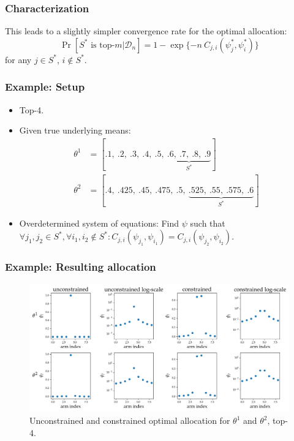 \documentclass[aspectratio=43]{beamer}
\begin{document}
\begin{frame}
\frametitle{Characterization}
  This leads to a slightly simpler convergence rate for the optimal allocation:
  \[\Pr[S^* \text{ is top-}m |
      \mathcal{D}_n] = 1 - \exp\{-n\ C_{j, i}(\psi^*_j, \psi^*_i)\}\]
  for any $j \in S^*$, $i \notin S^*$.
\end{frame}

\begin{frame}
\frametitle{Example: Setup}
\begin{itemize}[<+->]
  \item Top-4.
  \item Given true underlying means:
    \begin{align}
      \theta^1 &= [.1,\ .2,\ .3,\ .4,\ .5,\ \underbrace{.6,\ .7,\ .8,\
    .9}_\text{$S^*$}] \\
      \theta^2 &= [.4,\ .425,\ .45,\ .475,\ .5,\ \underbrace{.525,\ .55,\
    .575,\ .6}_\text{$S^*$}]
    \end{align}
  \item Overdetermined system of equations: Find $\psi$ such that $\forall j_1,
    j_2 \in S^*, \forall i_1, i_2 \notin S^*: C_{j, i}(\psi_{j_1}, \psi_{i_1})
    = C_{j, i}(\psi_{j_2}, \psi_{i_2})$.
\end{itemize}
\end{frame}

\begin{frame}
\frametitle{Example: Resulting allocation}
\begin{figure}[h]
  \centering
  \includegraphics[width=\textwidth]{optimal_allocation.png}
  \caption{Unconstrained and constrained optimal allocation for $\theta^1$ and $\theta^2$, top-4.}
  \label{fig:optimal_allocation}
\end{figure}
\end{frame}
\end{document}
